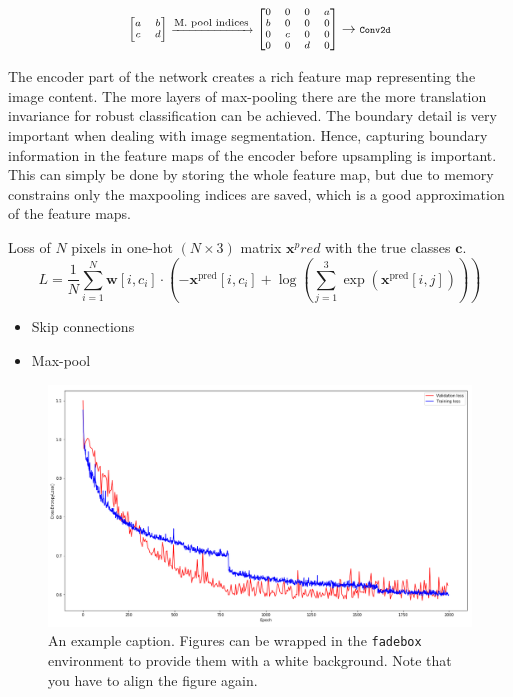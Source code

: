 \documentclass[
]{dtuposter}
\begin{document}
\begin{dtupostercontent}
\begin{equation*}\label{key}
\scriptsize
\begin{bmatrix}a&b\\c&d\end{bmatrix} \xrightarrow{\text{\scriptsize M. pool indices}}
\begin{bmatrix}0&0&0&a\\b&0&0&0\\0&c&0&0\\0&0&d&0\end{bmatrix} 
\rightarrow 
\texttt{\scriptsize Conv2d}
\end{equation*}

The encoder part of the network creates a rich feature map representing the image content. The more 
layers of max-pooling there are the more translation invariance for robust 
classification can be achieved. The boundary detail is very important when 
dealing with image segmentation. Hence, capturing boundary information in 
the feature maps of the encoder before upsampling is important. This can 
simply be done by storing the whole feature map, but due to memory 
constrains only the maxpooling indices are saved, which is a good 
approximation of the feature maps. 


Loss of \(N\) pixels in one-hot \((N \times  3)\) matrix \(\mathbf x^pred\) with the true classes \(\mathbf c\).
\[
L = \frac 1 N \sum_{i=1}^{N} \mathbf{w}[i, c_i]  \cdot 
\left( 
-\mathbf x^\text{pred}[i, c_i] + \log
\left(
\sum_{j=1}^{3}\exp(\mathbf x^\text{pred}[i, j])
\right)
\right)
\]

\begin{itemize}
	\item Skip connections
	\item Max-pool
\end{itemize}


\begin{figure}
	\begin{fadebox}\begin{center}
			\includegraphics[width=\linewidth,origin=c]{loss}
	\end{center}\end{fadebox}
	\caption{An example caption. Figures can be wrapped in the \texttt{fadebox} 
		environment to provide them with a white background. Note that you have to align the 
		figure again.}\label{fig:example2}
\end{figure}


\end{dtupostercontent}
\end{document}
